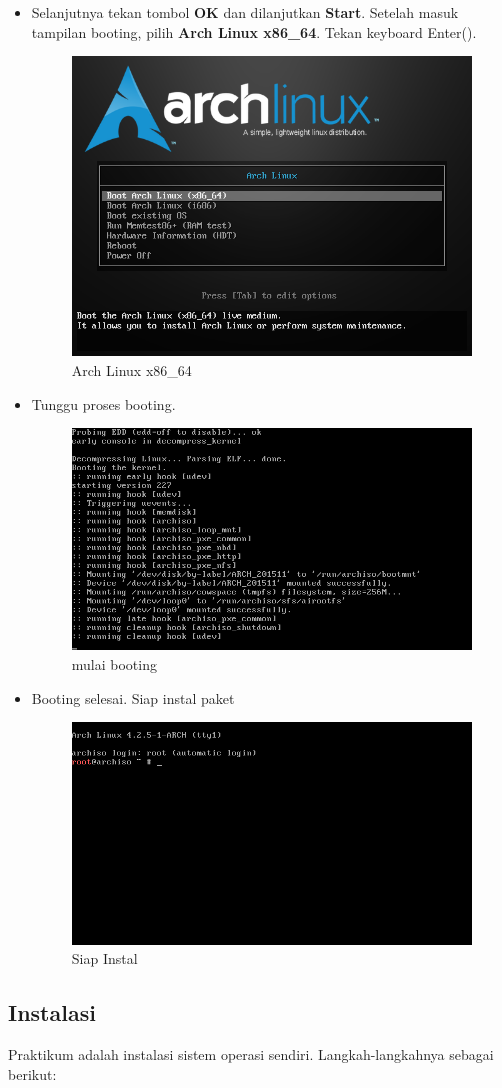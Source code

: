 \documentclass[12pt,]{article}
\begin{document}
\begin{itemize}
		\item Selanjutnya tekan tombol \textbf{OK} dan dilanjutkan \textbf{Start}.
		Setelah masuk tampilan booting, pilih \textbf{Arch Linux x86\_64}.
		Tekan keyboard Enter(\keys{\return}).
		\begin{figure}[H]
			\centering
			\includegraphics[width=0.4\linewidth]{images/vbox_linuxinstall/s1}
			\caption{Arch Linux x86\_64}
		\end{figure}
	
		\item Tunggu proses booting.
		\begin{figure}[H]
			\centering
			\includegraphics[width=0.4\linewidth]{images/vbox_linuxinstall/s2}
			\caption{mulai booting}
		\end{figure}
	
		\item Booting selesai. Siap instal paket
		\begin{figure}[H]
			\centering
			\includegraphics[width=0.4\linewidth]{images/vbox_linuxinstall/s3}
			\caption{Siap Instal}
		\end{figure}
	\end{itemize}
	
	\subsection{Instalasi}
	Praktikum adalah instalasi sistem operasi sendiri.
	Langkah-langkahnya sebagai berikut:
	
\end{document}
